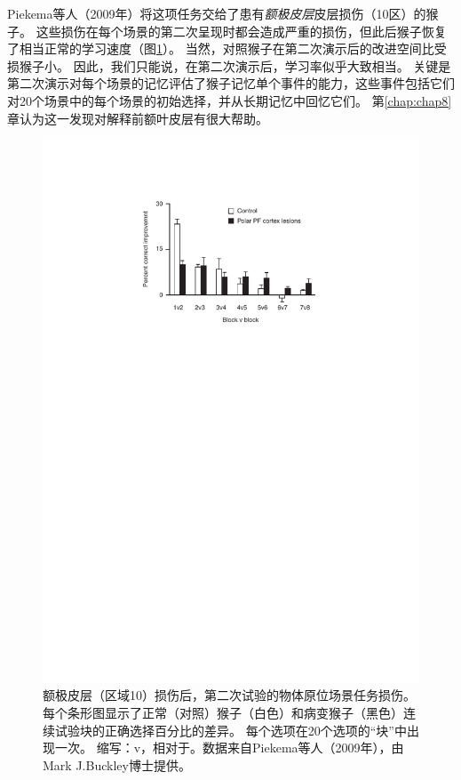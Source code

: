 Piekema等人（2009年）将这项任务交给了患有\textit{额极皮层}皮层损伤（10区）的猴子。
这些损伤在每个场景的第二次呈现时都会造成严重的损伤，但此后猴子恢复了相当正常的学习速度（图\ref{fig:3_10}）。
当然，对照猴子在第二次演示后的改进空间比受损猴子小。
因此，我们只能说，在第二次演示后，学习率似乎大致相当。
关键是第二次演示对每个场景的记忆评估了猴子记忆单个事件的能力，这些事件包括它们对20个场景中的每个场景的初始选择，并从长期记忆中回忆它们。
第\ref{chap:chap8}章认为这一发现对解释前额叶皮层有很大帮助。\par


\begin{figure}[!htb]
	\centering
	\includegraphics{chap3/3_10}
	\caption{额极皮层（区域10）损伤后，第二次试验的物体原位场景任务损伤。每个条形图显示了正常（对照）猴子（白色）和病变猴子（黑色）连续试验块的正确选择百分比的差异。
		每个选项在20个选项的“块”中出现一次。
		缩写：v，相对于。数据来自Piekema等人（2009年），由Mark J.Buckley博士提供。}
	\label{fig:3_10}
\end{figure}




